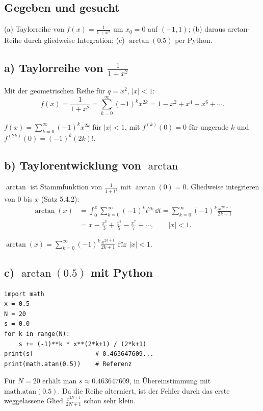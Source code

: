 
\subsection*{Gegeben und gesucht}
(a) Taylorreihe von $f(x)=\frac1{1+x^2}$ um $x_0=0$ auf $(-1,1)$; (b) daraus
arctan-Reihe durch gliedweise Integration; (c) $\arctan(0.5)$ per Python.

\subsection*{a) Taylorreihe von $\frac1{1+x^2}$}
Mit der geometrischen Reihe für $q=x^2$, $|x|<1$:
\begin{equation}
  f(x)=\frac1{1+x^2}=\sum_{k=0}^{\infty}(-1)^k x^{2k}
  =1-x^2+x^4-x^6+\cdots .
\end{equation}

\begin{ergebnis}
$\displaystyle f(x)=\sum_{k=0}^{\infty}(-1)^k x^{2k}$ für
$|x|<1$, mit $f^{(k)}(0)=0$ für ungerade $k$ und
$f^{(2k)}(0)=(-1)^k(2k)!$.
\end{ergebnis}

\subsection*{b) Taylorentwicklung von $\arctan$}
$\arctan$ ist Stammfunktion von $\frac1{1+t^2}$ mit $\arctan(0)=0$. Gliedweise
integrieren von $0$ bis $x$ (Satz 5.4.2):
\begin{align}
  \arctan(x)
  &= \int_0^x \sum_{k=0}^{\infty}(-1)^k t^{2k}\,\dd t
   = \sum_{k=0}^{\infty}(-1)^k \frac{x^{2k+1}}{2k+1} \\
  &= x-\frac{x^3}{3}+\frac{x^5}{5}-\frac{x^7}{7}+\cdots,\qquad |x|<1 .
\end{align}

\begin{ergebnis}
$\displaystyle\arctan(x)=\sum_{k=0}^{\infty}(-1)^k\frac{x^{2k+1}}{2k+1}$
für $|x|<1$.
\end{ergebnis}

\subsection*{c) $\arctan(0.5)$ mit Python}
\begin{verbatim}
import math
x = 0.5
N = 20
s = 0.0
for k in range(N):
    s += (-1)**k * x**(2*k+1) / (2*k+1)
print(s)                 # 0.463647609...
print(math.atan(0.5))    # Referenz
\end{verbatim}
Für $N=20$ erhält man $s\approx0.463647609$, in Übereinstimmung mit
$\mathrm{math.atan}(0.5)$. Da die Reihe alterniert, ist der Fehler durch das
erste weggelassene Glied $\tfrac{x^{2N+1}}{2N+1}$ schon sehr klein.

